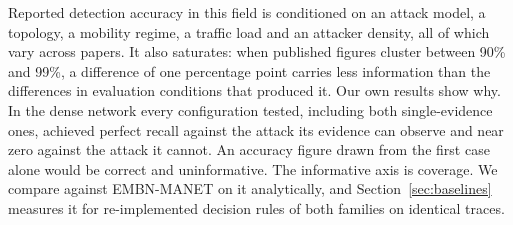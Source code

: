 Reported detection accuracy in this field is conditioned on an attack model,
a topology, a mobility regime, a traffic load and an attacker density, all
of which vary across papers. It also saturates: when published figures
cluster between 90\% and 99\%, a difference of one percentage point carries
less information than the differences in evaluation conditions that
produced it. Our own results show why. In the dense network every configuration
tested, including both single-evidence ones, achieved perfect recall against
the attack its evidence can observe and near zero against the attack it
cannot. An accuracy
figure drawn from the first case alone would be correct and uninformative.
The informative axis is coverage. We compare against EMBN-MANET on it
analytically, and Section~\ref{sec:baselines} measures it for re-implemented
decision rules of both families on identical traces.
